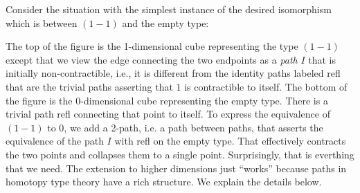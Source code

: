 \documentclass[authoryear,preprint]{sigplanconf}
\newcommand{\mm}{\texttt{-}}
\newcommand{\pp}{\texttt{+}}
\begin{document}
Consider the situation with the simplest instance of the desired isomorphism
which is between $(1-1)$ and the empty type:
\begin{center}
\end{center}
The top of the figure is the 1-dimensional cube representing the type $(1-1)$
except that we view the edge connecting the two endpoints as a \emph{path}
$I$ that is initially non-contractible, i.e., it is different from the
identity paths labeled \textsf{refl} that are the trivial paths asserting
that $1$ is contractible to itself. The bottom of the figure is the
0-dimensional cube representing the empty type. There is a trivial path
\textsf{refl} connecting that point to itself. To express the equivalence of
$(1-1)$ to 0, we add a 2-path, i.e. a path between paths, that asserts the
equivalence of the path $I$ with \textsf{refl} on the empty type. That
effectively contracts the two points and collapses them to a single
point. Surprisingly, that is everthing that we need. The extension to higher
dimensions just ``works'' because paths in homotopy type theory have a rich
structure. We explain the details below. 
\end{document}
